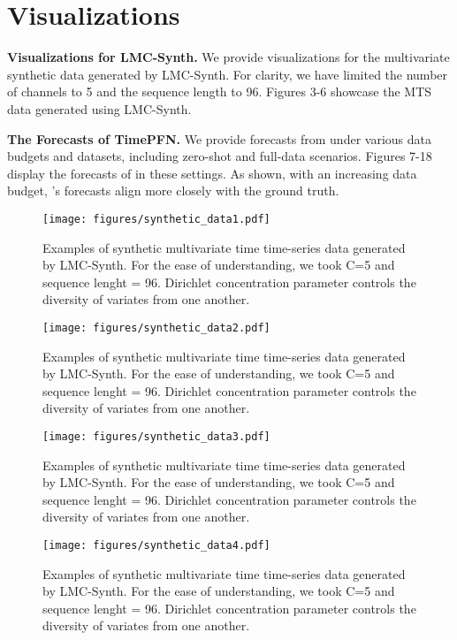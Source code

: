 \section{Visualizations}

\textbf{Visualizations for LMC-Synth.} We provide visualizations for the multivariate synthetic data generated by LMC-Synth. For clarity, we have limited the number of channels to 5 and the sequence length to 96. Figures 3-6 showcase the MTS data generated using LMC-Synth.

\textbf{The Forecasts of TimePFN.} We provide forecasts from \name under various data budgets and datasets, including zero-shot and full-data scenarios. Figures 7-18 display the forecasts of \name in these settings. As shown, with an increasing data budget, \name's forecasts align more closely with the ground truth.



\begin{figure*}
    \centering
    \texttt{[image: figures/synthetic\_data1.pdf]}
    \caption{Examples of synthetic multivariate time time-series data generated by LMC-Synth. For the ease of understanding, we took C=5 and sequence lenght = 96. Dirichlet concentration parameter controls the diversity of variates from one another. }
    \label{fig:LMC-synth1}
\end{figure*}

\begin{figure*}
    \centering
    \texttt{[image: figures/synthetic\_data2.pdf]}
    \caption{Examples of synthetic multivariate time time-series data generated by LMC-Synth. For the ease of understanding, we took C=5 and sequence lenght = 96. Dirichlet concentration parameter controls the diversity of variates from one another. }    \label{fig:LMC-synth2}
\end{figure*}

\begin{figure*}
    \centering
    \texttt{[image: figures/synthetic\_data3.pdf]}
    \caption{Examples of synthetic multivariate time time-series data generated by LMC-Synth. For the ease of understanding, we took C=5 and sequence lenght = 96. Dirichlet concentration parameter controls the diversity of variates from one another. }    \label{fig:LMC-synth3}
\end{figure*}

\begin{figure*}
    \centering
    \texttt{[image: figures/synthetic\_data4.pdf]}
    \caption{Examples of synthetic multivariate time time-series data generated by LMC-Synth. For the ease of understanding, we took C=5 and sequence lenght = 96. Dirichlet concentration parameter controls the diversity of variates from one another. }    \label{fig:LMC-synth4}
\end{figure*}



